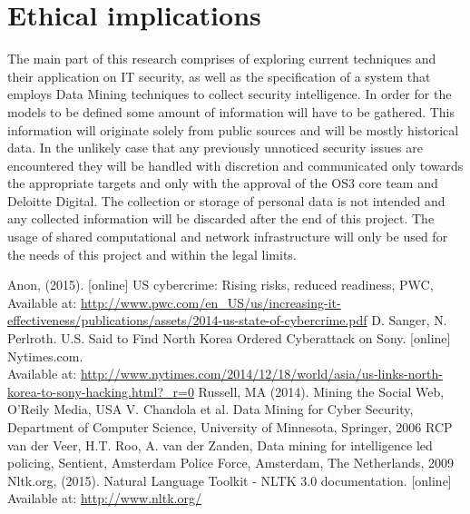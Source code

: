 \documentclass[12pt]{article}
\begin{document}
\section{Ethical implications}
The main part of this research comprises of exploring current techniques and their application on IT security, as well as the specification of a system that employs Data Mining techniques to collect security intelligence. In order for the models to be defined some amount of information will have to be gathered. This information will originate solely from public sources and will be mostly historical data. In the unlikely case that any previously unnoticed security issues are encountered they will be handled with discretion and communicated only towards the appropriate targets and only with the approval of the OS3 core team and Deloitte Digital. The collection or storage of personal data is not intended and any collected information will be discarded after the end of this project. The usage of shared computational and network infrastructure will only be used for the needs of this project and within the legal limits.

\newpage

\begin{thebibliography}{99}
	Anon, (2015). [online] US cybercrime: Rising risks, reduced readiness, PWC, Available at: \url{http://www.pwc.com/en_US/us/increasing-it-effectiveness/publications/assets/2014-us-state-of-cybercrime.pdf}
	 D. Sanger, N. Perlroth.  U.S. Said to Find North Korea Ordered Cyberattack on Sony. [online] Nytimes.com. \\Available at: \url{http://www.nytimes.com/2014/12/18/world/asia/us-links-north-korea-to-sony-hacking.html?_r=0}
  Russell, MA (2014). Mining the Social Web, O'Reily Media, USA
    V. Chandola et al. Data Mining for Cyber Security, Department of Computer Science, University of Minnesota, Springer, 2006
   RCP van der Veer, H.T. Roo,  A. van der Zanden, Data mining for intelligence led policing, Sentient, Amsterdam Police Force, Amsterdam, The Netherlands, 2009
Nltk.org, (2015). Natural Language Toolkit - NLTK 3.0 documentation. [online] Available at: \url{http://www.nltk.org/}
\end{thebibliography}
\end{document}
